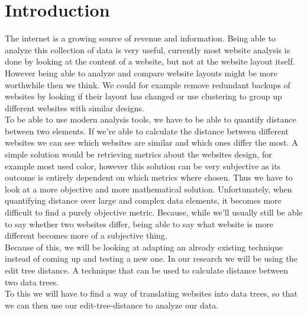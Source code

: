 \chapter{Introduction}\label{introduction}
The internet is a growing source of revenue and information. Being able to analyze this collection of data is very useful, currently most website analysis is done by looking at the content of a website, but not at the website layout itself. However being able to analyze and compare website layouts might be more worthwhile then we think. We could for example remove redundant backups of websites by looking if their layout has changed or use clustering to group up different websites with similar designs.\\
To be able to use modern analysis tools, we have to be able to quantify distance between two elements. If we're able to calculate the distance between different websites we can see which websites are similar and which ones differ the most. A simple solution would be retrieving metrics about the websites design, for example most used color, however this solution can be very subjective as its outcome is entirely dependent on which metrics where chosen. Thus we have to look at a more objective and more mathematical solution. Unfortunately, when quantifying distance over large and complex data elements, it becomes more difficult to find a purely objective metric. Because, while we'll usually still be able to say whether two websites differ, being able to say what website is more different becomes more of a subjective thing.\\
Because of this, we will be looking at adapting an already existing technique instead of coming up and testing a new one. In our research we will be using the edit tree distance. A technique that can be used to calculate distance between two data trees.\\
To this we will have to find a way of translating websites into data trees, so that we can then use our edit-tree-distance to analyze our data.